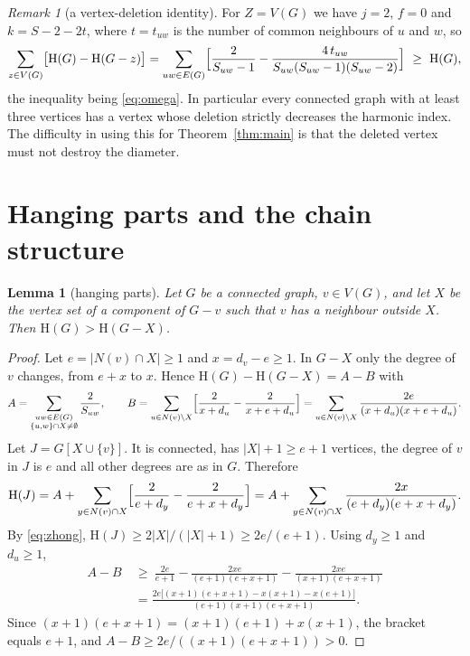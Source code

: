 \documentclass[11pt]{article}
\newtheorem{lemma}[theorem]{Lemma}
\theoremstyle{definition}
\theoremstyle{remark}
\newtheorem{remark}[theorem]{Remark}
\newcommand{\Hm}{\mathrm{H}}
\begin{document}
\begin{remark}[a vertex-deletion identity]\label{rem:identity}
For $Z=V(G)$ we have $j=2$, $f=0$ and $k=S-2-2t$, where $t=t_{uw}$ is the number of common
neighbours of $u$ and $w$, so
\[
 \sum_{z\in V(G)}\bigl[\Hm(G)-\Hm(G-z)\bigr]
 =\sum_{uw\in E(G)}\Bigl[\frac{2}{S_{uw}-1}-\frac{4\,t_{uw}}{S_{uw}(S_{uw}-1)(S_{uw}-2)}\Bigr]
 \ \ge\ \Hm(G),
\]
the inequality being \eqref{eq:omega}. In particular every connected graph with at least
three vertices has a vertex whose deletion strictly decreases the harmonic index. The difficulty in using this for
Theorem~\ref{thm:main} is that the deleted vertex must not destroy the diameter.
\end{remark}

\section{Hanging parts and the chain structure}\label{sec:hanging}

\begin{lemma}[hanging parts]\label{lem:hanging}
Let $G$ be a connected graph, $v\in V(G)$, and let $X$ be the vertex set of a component of
$G-v$ such that $v$ has a neighbour outside $X$. Then $\Hm(G)>\Hm(G-X)$.
\end{lemma}
\begin{proof}
Let $e=|N(v)\cap X|\ge1$ and $x=d_v-e\ge1$. In $G-X$ only the degree of $v$ changes, from
$e+x$ to $x$. Hence $\Hm(G)-\Hm(G-X)=A-B$ with
\[
 A=\sum_{\substack{uw\in E(G)\\ \{u,w\}\cap X\ne\emptyset}}\frac2{S_{uw}},\qquad
 B=\sum_{u\in N(v)\setminus X}\Bigl[\frac{2}{x+d_u}-\frac2{x+e+d_u}\Bigr]
 =\sum_{u\in N(v)\setminus X}\frac{2e}{(x+d_u)(x+e+d_u)} .
\]
Let $J=G[X\cup\{v\}]$. It is connected, has $|X|+1\ge e+1$ vertices, the degree of $v$ in $J$
is $e$ and all other degrees are as in $G$. Therefore
\[
 \Hm(J)=A+\sum_{y\in N(v)\cap X}\Bigl[\frac2{e+d_y}-\frac2{e+x+d_y}\Bigr]
 =A+\sum_{y\in N(v)\cap X}\frac{2x}{(e+d_y)(e+x+d_y)} .
\]
By \eqref{eq:zhong}, $\Hm(J)\ge 2|X|/(|X|+1)\ge 2e/(e+1)$. Using $d_y\ge1$ and $d_u\ge1$,
\begin{align*}
 A-B\ &\ge\ \frac{2e}{e+1}-\frac{2xe}{(e+1)(e+x+1)}-\frac{2xe}{(x+1)(e+x+1)}\\
 &=\frac{2e\bigl[(x+1)(e+x+1)-x(x+1)-x(e+1)\bigr]}{(e+1)(x+1)(e+x+1)} .
\end{align*}
Since $(x+1)(e+x+1)=(x+1)(e+1)+x(x+1)$, the bracket equals $e+1$, and
$A-B\ge 2e/((x+1)(e+x+1))>0$.
\end{proof}
\end{document}
